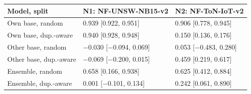 \begin{tabular}{@{}lll@{}}
\toprule
Model, split & N1: NF-UNSW-NB15-v2 & N2: NF-ToN-IoT-v2 \\
\midrule
Own base, random & 0.939 [0.922, 0.951] & 0.906 [0.778, 0.945] \\
Own base, dup.-aware & 0.940 [0.928, 0.948] & 0.150 [0.136, 0.176] \\
Other base, random & $-$0.030 [$-$0.094, 0.069] & 0.053 [$-$0.483, 0.280] \\
Other base, dup.-aware & $-$0.069 [$-$0.200, 0.015] & 0.459 [0.219, 0.617] \\
Ensemble, random & 0.658 [0.166, 0.938] & 0.625 [0.412, 0.884] \\
Ensemble, dup.-aware & 0.001 [$-$0.101, 0.134] & 0.242 [0.061, 0.890] \\
\bottomrule
\end{tabular}
